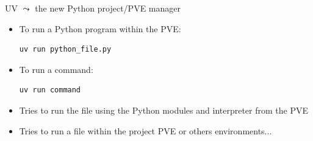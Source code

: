 \documentclass[11pt, serif, mathserif, compress]{beamer}  %
\newcommand{\boldtt}[1]{{\ttfamily\bfseries #1}}
\begin{document}
\begin{frame}[fragile]{UV $\leadsto$ the new Python project/PVE manager}
  \begin{tcolorbox}[title=Command: \boldtt{uv run}, add to width=5mm]
    \begin{itemize}
    \item<1-> To run a Python program within the PVE:
      \begin{verbatim}
uv run python_file.py
      \end{verbatim}
      \item<3-> To run a command:
      \begin{verbatim}
uv run command
      \end{verbatim}
    \end{itemize}
  \end{tcolorbox}

  {
    \small 
    \begin{itemize}\setlength\itemsep{0mm}               
    \item<2-> Tries to run the file  using the Python modules and interpreter from the PVE
    \item<4-> Tries to run a file  within the project PVE or others environments...\\
    \end{itemize}
  }

\end{frame}
\end{document}
